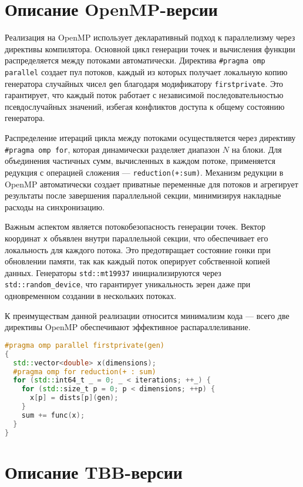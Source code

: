 \documentclass[a4paper,12pt]{article}
\begin{document}
\section{Описание OpenMP-версии}

Реализация на OpenMP использует декларативный подход к параллелизму через директивы компилятора. Основной цикл генерации точек и вычисления функции распределяется между потоками автоматически. Директива \texttt{\#pragma omp parallel} создает пул потоков, каждый из которых получает локальную копию генератора случайных чисел \texttt{gen} благодаря модификатору \texttt{firstprivate}. Это гарантирует, что каждый поток работает с независимой последовательностью псевдослучайных значений, избегая конфликтов доступа к общему состоянию генератора.

Распределение итераций цикла между потоками осуществляется через директиву \texttt{\#pragma omp for}, которая динамически разделяет диапазон \( N \) на блоки. Для объединения частичных сумм, вычисленных в каждом потоке, применяется редукция с операцией сложения — \texttt{reduction(+:sum)}. Механизм редукции в OpenMP автоматически создает приватные переменные для потоков и агрегирует результаты после завершения параллельной секции, минимизируя накладные расходы на синхронизацию.

Важным аспектом является потокобезопасность генерации точек. Вектор координат \texttt{x} объявлен внутри параллельной секции, что обеспечивает его локальность для каждого потока. Это предотвращает состояние гонки при обновлении памяти, так как каждый поток оперирует собственной копией данных. Генераторы \texttt{std::mt19937} инициализируются через \texttt{std::random\_device}, что гарантирует уникальность зерен даже при одновременном создании в нескольких потоках.

К преимуществам данной реализации относится минимализм кода — всего две директивы OpenMP обеспечивают эффективное распараллеливание.

\begin{lstlisting}[language=C++, caption=Фрагмент OMP-реализации]
#pragma omp parallel firstprivate(gen)
{
  std::vector<double> x(dimensions);
  #pragma omp for reduction(+ : sum)
  for (std::int64_t _ = 0; _ < iterations; ++_) {
    for (std::size_t p = 0; p < dimensions; ++p) {
      x[p] = dists[p](gen);
    }
    sum += func(x); 
  }
}
\end{lstlisting}

\newpage

\section{Описание TBB-версии}
\end{document}

